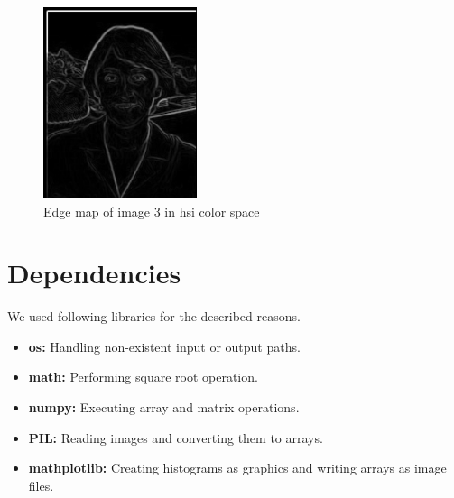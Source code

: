 \documentclass[conference]{IEEEtran}
\begin{document}
\begin{figure}[H]
    \centering
    \includegraphics[width=0.4\textwidth]{resources/3_hsi_colored_edges.png}
    \caption{Edge map of image 3 in hsi color space}
    \label{fig:image_3_hsi_edges}
\end{figure}

\section{Dependencies}
We used following libraries for the described reasons.
\begin{itemize}
	\item \textbf{os:} Handling non-existent input or output paths.
	\item \textbf{math:} Performing square root operation.
	\item \textbf{numpy:} Executing array and matrix operations.
	\item \textbf{PIL:} Reading images and converting them to arrays.
	\item \textbf{mathplotlib:} Creating histograms as graphics and writing arrays as image files.
\end{itemize}
\end{document}

